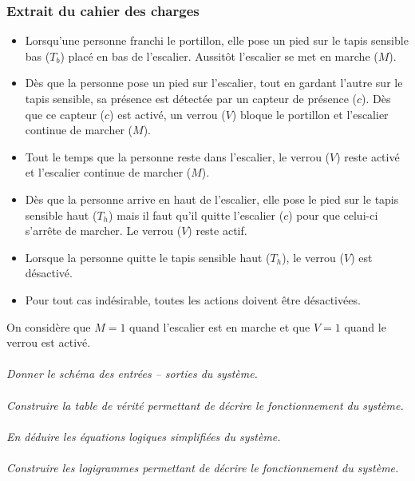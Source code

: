 \documentclass[11pt,oneside]{article}
\begin{document}
\subsubsection*{Extrait du cahier des charges}
\begin{itemize}
\item Lorsqu'une personne franchi le portillon, elle pose un pied sur le tapis sensible bas ($T_b$) placé en bas de l'escalier. Aussitôt l'escalier se met en marche ($M$).
\item Dès que la personne pose un pied sur l'escalier, tout en gardant l'autre sur le tapis sensible, sa présence est détectée par un capteur de présence ($c$). Dès que ce capteur ($c$) est activé, un verrou ($V$) bloque le portillon et l'escalier continue de marcher ($M$).
\item Tout le temps que la personne reste dans l'escalier, le verrou ($V$) reste activé et l'escalier continue de marcher ($M$).
\item Dès que la personne arrive en haut de l'escalier, elle pose le pied sur le tapis sensible haut ($T_h$) mais il faut qu'il quitte l'escalier ($c$) pour que celui-ci s'arrête de marcher. Le verrou ($V$) reste actif. 
\item Lorsque la personne quitte le tapis sensible haut ($T_h$), le verrou ($V$) est désactivé. 
\item Pour tout cas indésirable, toutes les actions doivent être désactivées.
\end{itemize}

On considère que $M=1$ quand l'escalier est en marche et que $V=1$ quand le verrou est activé. 

\paragraph{}
\textit{Donner le schéma des entrées -- sorties du système.}

\paragraph{}
\textit{Construire la table de vérité permettant de décrire le fonctionnement du système.}

\paragraph{}
\textit{En déduire les équations logiques simplifiées du système.}

\paragraph{}
\textit{Construire les logigrammes permettant de décrire le fonctionnement du système.}
\end{document}
